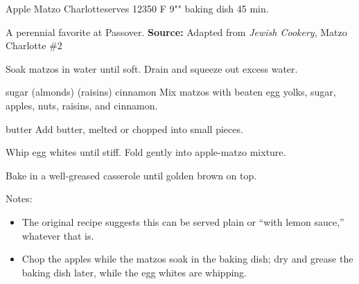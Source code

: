 \begin{recipe}{Apple Matzo Charlotte}{serves 12}{350\0 F \hfill 9"" baking dish \hfill 45 min.}

 \freeform A perennial favorite at Passover.
 \textbf{Source:} Adapted from \textit{Jewish Cookery}, Matzo Charlotte \#2

 Soak matzos in water until soft. Drain and squeeze out excess water.

  {sugar}
  {(almonds)}
  {(raisins)}
  {cinnamon}
 Mix matzos with beaten egg yolks, sugar, apples, nuts, raisins, and cinnamon.

  {butter}
 Add butter, melted or chopped into small pieces.

 Whip egg whites until stiff. Fold gently into apple-matzo mixture.

 \newstep Bake in a well-greased casserole until golden brown on top.

 \freeform Notes:
 \begin{itemize}
  \item The original recipe suggests this can be served plain or ``with lemon sauce,'' whatever that is.
  \item Chop the apples while the matzos soak in the baking dish; dry and grease the baking dish later, while the egg whites are whipping.
 \end{itemize}
\end{recipe}
